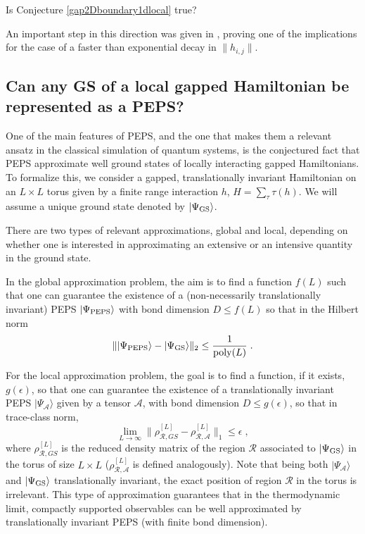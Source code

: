 \documentclass[smallextended]{svjour3}
\renewcommand{\1}{\mathbbm{1}}
\newcommand{\ket} [1] {\vert #1 \rangle}
\begin{document}
\begin{question}
    Is Conjecture \ref{gap2Dboundary1dlocal} true?
\end{question}

An important step in this direction was given in \cite{Katroyano-boundary}, proving one of the implications for the case of a faster than exponential decay in $\|h_{i,j}\|$.



\subsection{Can any GS of a local gapped Hamiltonian be represented as a PEPS?}

One of the main features of PEPS, and the one that makes them a relevant ansatz in the classical simulation of quantum systems, is the conjectured fact that PEPS approximate well ground states of locally interacting gapped Hamiltonians. To formalize this, we consider a gapped, translationally invariant Hamiltonian on an $L\times L$ torus given by a finite range interaction $h$, $H=\sum_\tau \tau(h)$. We will assume a unique ground state denoted by  $\ket{\Psi_{\rm GS}}$.

There are two types of relevant approximations, global and local, depending on whether one is interested in approximating an extensive or an intensive quantity in the ground state.

In the global approximation problem, the aim is to find a function $f(L)$ such that one can guarantee the existence of a (non-necessarily translationally invariant) PEPS $\ket{\Psi_{\rm PEPS}}$ with bond dimension $D\le f(L)$ so that in the Hilbert norm
$$\|\ket{\Psi_{\rm PEPS}}-\ket{\Psi_{\rm GS}}\|_2\le \frac{1}{{\rm poly}(L)} \; .$$

For the local approximation problem, the goal is to find a function, if it exists, $g(\epsilon)$, so that one can guarantee the existence of a translationally invariant PEPS $\ket{\Psi_\mathcal{A}}$ given by a tensor $\mathcal{A}$, with bond dimension $D\le g(\epsilon)$, so that in trace-class norm,
$$\lim_{L\rightarrow \infty} \|\rho^{[L]}_{\mathcal{R}, GS}-\rho^{[L]}_{\mathcal{R}, \mathcal{A}}\|_1\le \epsilon\; ,$$
where $\rho^{[L]}_{\mathcal{R}, GS}$ is the reduced density matrix of the region $\mathcal{R}$ associated to $\ket{\Psi_{\rm GS}}$ in the torus of size $L\times L$ ($\rho^{[L]}_{\mathcal{R}, \mathcal{A}}$ is defined analogously). Note that being both $\ket{\Psi_\mathcal{A}}$ and $\ket{\Psi_{\rm GS}}$ translationally invariant, the exact position of region $\mathcal{R}$ in the torus is irrelevant.  This type of approximation guarantees that in the thermodynamic limit, compactly supported observables can be well approximated by translationally invariant PEPS (with finite bond dimension).
\end{document}
